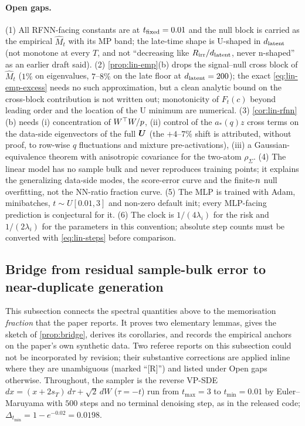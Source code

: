 \paragraph{Open gaps.}
(1) All RFNN-facing constants are at $t_{\rm fixed}=0.01$ and the null block is carried as the empirical $\widehat M_t$ with its MP band; the late-time shape is U-shaped in $d_{\mathrm{latent}}$ (not monotone at every $T$, and not ``decreasing like $R_{\mathrm{irr}}/d_{\mathrm{latent}}$, never n-shaped'' as an earlier draft said). (2) \cref{prop:lin-emp}(b) drops the signal--null cross block of $\widehat M_t$ ($1\%$ on eigenvalues, $7$--$8\%$ on the late floor at $d_{\mathrm{latent}}=200$); the exact \eqref{eq:lin-emp-excess} needs no such approximation, but a clean analytic bound on the cross-block contribution is not written out; monotonicity of $F_t(c)$ beyond leading order and the location of the U minimum are numerical. (3) \cref{cor:lin-rfnn}(b) needs (i) concentration of $W^{\top}W/p$, (ii) control of the $a_*(q)z$ cross terms on the data-side eigenvectors of the full $\bm{U}$ (the $+4$--$7\%$ shift is attributed, without proof, to row-wise $q$ fluctuations and mixture pre-activations), (iii) a Gaussian-equivalence theorem with anisotropic covariance for the two-atom $\rho_\Sigma$. (4) The linear model has no sample bulk and never reproduces training points; it explains the generalizing data-side modes, the score-error curve and the finite-$n$ null overfitting, not the NN-ratio fraction curve. (5) The MLP is trained with Adam, minibatches, $t\sim U[0.01,3]$ and non-zero default init; every MLP-facing prediction is conjectural for it. (6) The clock is $1/(4\lambda_i)$ for the risk and $1/(2\lambda_i)$ for the parameters in this convention; absolute step counts must be converted with \eqref{eq:lin-steps} before comparison.

\subsection{Bridge from residual sample-bulk error to near-duplicate generation}
\label{app:theory-bridge}

This subsection connects the spectral quantities above to the memorisation \emph{fraction} that the paper reports. It proves two elementary lemmas, gives the sketch of \cref{prop:bridge}, derives its corollaries, and records the empirical anchors on the paper's own synthetic data. Two referee reports on this subsection could not be incorporated by revision; their substantive corrections are applied inline where they are unambiguous (marked ``[R]'') and listed under Open gaps otherwise. Throughout, the sampler is the reverse VP-SDE $dx=(x+2s_T)\,d\tau+\sqrt2\,dW$ ($\tau=-t$) run from $t_{\max}=3$ to $t_{\min}=0.01$ by Euler--Maruyama with $500$ steps and no terminal denoising step, as in the released code; $\Delta_{t_{\min}}=1-e^{-0.02}=0.0198$.

